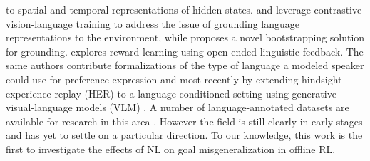 \documentclass[../thesis-proposal/main.tex]{subfiles}
\begin{document}
to spatial and temporal representations of hidden states.  and
\citet{fan_minedojo_2022} leverage contrastive vision-language training to address the issue of
grounding language representations to the environment, while \citet{watkins_teachable_2021} proposes
a novel bootstrapping solution for grounding.  explores reward learning
using open-ended linguistic feedback. The same authors contribute formalizations of the type of
language a modeled speaker could use for preference expression \citep{sumers_how_2022} and most
recently by extending hindsight experience replay (HER) \citep{andrychowicz_hindsight_2017} to
a language-conditioned setting using generative visual-language models (VLM)
\citep{alayrac_flamingo_2022}. A number of language-annotated datasets are available for research in
this area \citep{zholus_iglu_2022, mees_calvin_2022, fan_minedojo_2022, shridhar_alfred_2020,
jiang_yunfan_vima_2022, liu_reinforcement_2022}. However the field is still clearly in early stages
and has yet to settle on a particular direction. To our knowledge, this work is the first to
investigate the effects of NL on goal misgeneralization in offline RL.


\ifSubfilesClassLoaded{%
  
}{}
\end{document}
